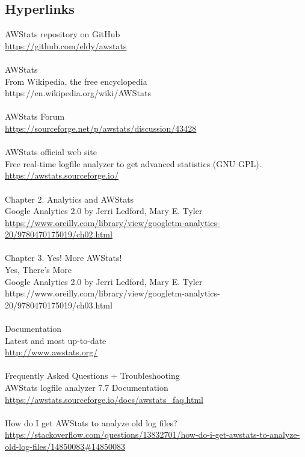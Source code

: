 
\subsection{Hyperlinks}

AWStats repository on GitHub\\
\href{https://github.com/eldy/awstats}{https://github.com/eldy/awstats}\\
\\
AWStats\\
From Wikipedia, the free encyclopedia\\
https://en.wikipedia.org/wiki/AWStats\\
\\
AWStats Forum\\
\href{https://sourceforge.net/p/awstats/discussion/43428}{https://sourceforge.net/p/awstats/discussion/43428}\\
\\
AWStats official web site\\
Free real-time logfile analyzer to get advanced statistics (GNU GPL).\\
\href{https://awstats.sourceforge.io/}{https://awstats.sourceforge.io/}\\
\\
Chapter 2. Analytics and AWStats\\
Google Analytics 2.0 by Jerri Ledford, Mary E. Tyler\\
\href{https://www.oreilly.com/library/view/googletm-analytics-20/9780470175019/ch02.html}{https://www.oreilly.com/library/view/googletm-analytics-20/9780470175019/ch02.html}\\
\\
Chapter 3. Yes! More AWStats!\\
Yes, There’s More\\
Google Analytics 2.0 by Jerri Ledford, Mary E. Tyler\\
https://www.oreilly.com/library/view/googletm-analytics-20/9780470175019/ch03.html\\
\\
Documentation\\
Latest and most up-to-date\\
\href{http://www.awstats.org/}{http://www.awstats.org/}\\
\\
Frequently Asked Questions + Troubleshooting\\
AWStats logfile analyzer 7.7 Documentation\\
\href{https://awstats.sourceforge.io/docs/awstats\_faq.html}{https://awstats.sourceforge.io/docs/awstats\_faq.html}\\
\\
How do I get AWStats to analyze old log files?\\
\href{https://stackoverflow.com/questions/13832701/how-do-i-get-awstats-to-analyze-old-log-files/14850083\#14850083}{https://stackoverflow.com/questions/13832701/how-do-i-get-awstats-to-analyze-old-log-files/14850083\#14850083}
